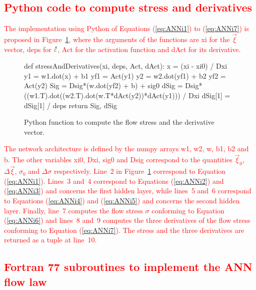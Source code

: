 \documentclass[algorithms,article,submit,pdftex,oneauthors]{Definitions/mdpi}
\DeclareRobustCommand{\mdot}[1]{\accentset{\mbox{\bfseries .}}{#1}}
\DeclareRobustCommand{\var}[1]{\textsf{#1}}
\begin{document}
\textcolor{red}{\section[\appendixname~\thesection]{Python code to compute stress and derivatives\label{sec:Appendix1}}}

\textcolor{red}{The implementation using Python of Equations (\ref{eq:ANNi1}) to (\ref{eq:ANNi7}) is proposed in Figure~\ref{fig:PythonStress}, where the arguments of the functions are \var{xi} for the $\overrightarrow{\xi}$ vector, \var{deps} for $\mdot{\varepsilon}$, \var{Act} for the activation function and \var{dAct} for its derivative.}
\begin{figure}[h!]
\begin{PythonListing}
def stressAndDerivatives(xi, deps, Act, dAct):
  x = (xi - xi0) / Dxi
  y1 = w1.dot(x) + b1
  yf1 = Act(y1)
  y2 = w2.dot(yf1) + b2
  yf2 = Act(y2)
  Sig = Dsig*(w.dot(yf2) + b) + sig0
  dSig = Dsig*((w1.T).dot((w2.T).dot(w.T*dAct(y2))*dAct(y1))) / Dxi
  dSig[1] = dSig[1] / deps
  return Sig, dSig
\end{PythonListing}
\caption{Python function to compute the flow stress and the derivative vector.\label{fig:PythonStress}}
\end{figure}
\textcolor{red}{The network architecture is defined by the numpy arrays \var{w1}, \var{w2}, \var{w}, \var{b1}, \var{b2} and \var{b}.
The other variables \var{xi0}, \var{Dxi}, \var{sig0} and \var{Dsig} correspond to the quantities $\overrightarrow{\xi}_{0}$, $\Delta\overrightarrow{\xi}$, $\sigma_{0}$ and $\Delta\sigma$ respectively.
Line~2 in Figure~\ref{fig:PythonStress} correspond to Equation (\ref{eq:ANNi1}). Lines~3 and~4 correspond to Equations (\ref{eq:ANNi2}) and (\ref{eq:ANNi3}) and concerns the first hidden layer, while lines~5 and~6 correspond to Equations (\ref{eq:ANNi4}) and (\ref{eq:ANNi5}) and concerns the second hidden layer. Finally, line~7 computes the flow stress $\sigma$ conforming to Equation (\ref{eq:ANNi6}) and lines~8 and~9 computes the three derivatives of the flow stress conforming to Equation (\ref{eq:ANNi7}). The stress and the three derivatives are returned as a tuple at line~10.}

\textcolor{red}{\section[\appendixname~\thesection]{Fortran 77 subroutines to implement the ANN flow law\label{sec:Appendix2}}}
\end{document}
